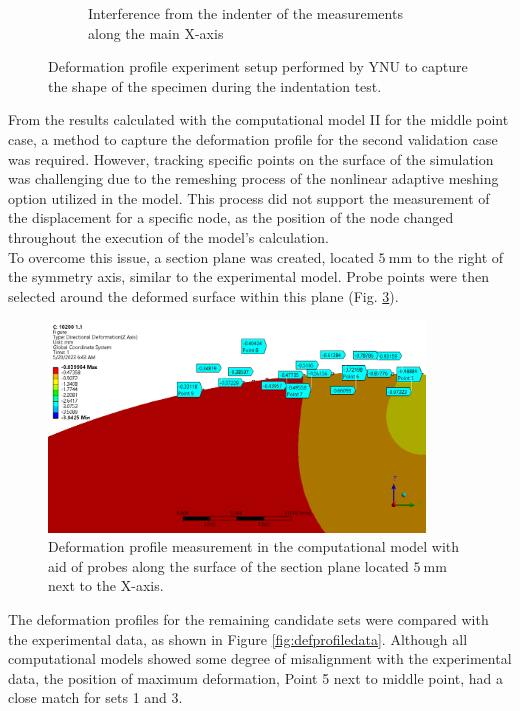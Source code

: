 \begin{figure}
\begin{subfigure}[b]{0.5\textwidth}
    \caption{Interference from the indenter of the measurements along the main X-axis}
    \label{fig:defprofinter}
    \end{subfigure}
    \hspace{0.3cm}
    \caption[Deformation profile experiment]{Deformation profile experiment setup performed by YNU to capture the shape of the specimen during the indentation test.}
    \label{fig:defprofexperiment}
\end{figure}

From the results calculated with the computational model II for the middle point case, 
a method to capture the deformation profile for the second validation case was required.
However, tracking specific points on the surface of the simulation was challenging due to 
the remeshing process of the nonlinear adaptive meshing option utilized in the model. This
process did not support the measurement of the displacement for a specific node, as the 
position of the node changed throughout the execution of the model's calculation.\\

To overcome this issue, a section plane was created, located $\SI{5}{\milli \meter}$ to the 
right of the symmetry axis, similar to the experimental model. Probe points were then
selected around the deformed surface within this plane (Fig. \ref{fig:defprofcompmodel}).

\begin{figure}%
	\centering
   \quad
   \includegraphics[width=10cm]{Images/validationcase/defprof/10200defprofile.png}%
   \caption[Deformation profile - Computational model]{Deformation profile measurement in the computational model with aid of probes along the surface of the section plane located $\SI{5}{\milli \meter}$ next to the X-axis.}%
   \label{fig:defprofcompmodel}%
\end{figure}

The deformation profiles for the remaining candidate sets were compared with the experimental
data, as shown in Figure \ref{fig:defprofiledata}. Although all computational models 
showed some degree of misalignment with the experimental data, the position of maximum deformation,
Point \SI{5}{} next to middle point, had a close match for sets \SI{1}{} and \SI{3}{}.

